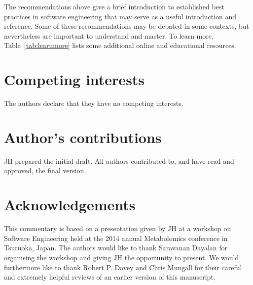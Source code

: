 \documentclass{bmcart}
\begin{document}
The recommendations above give a brief introduction to established best practices in software engineering that may serve as a useful introduction and reference. Some of these recommendations may be debated in some contexts, but nevertheless are important to understand and master. To learn more, Table~\ref{tab:learnmore} lists some additional online and educational resources. 


\begin{backmatter}

\section*{Competing interests}
  The authors declare that they have no competing interests.

\section*{Author's contributions}
  JH prepared the initial draft. All authors contributed to, and have read and approved, the final version. 

\section*{Acknowledgements}
  This commentary is based on a presentation given by JH at a workshop on Software Engineering held at the 2014 annual Metabolomics conference in Tsuruoka, Japan. The authors would like to thank Saravanan Dayalan for organising the workshop and giving JH the opportunity to present. We would furthermore like to thank Robert P. Davey and Chris Mungall for their careful and extremely helpful reviews of an earlier version of this manuscript. 


\end{backmatter}
\end{document}
